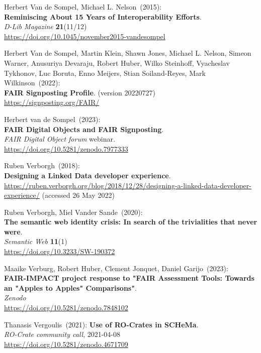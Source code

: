 \begin{thebibliography}{9}
Herbert Van de Sompel, Michael L. Nelson~(2015): \\
\textbf{Reminiscing About 15 Years of Interoperability Efforts}.\\
\emph{D-Lib Magazine} \textbf{21}(11/12) \\
\url{https://doi.org/10.1045/november2015-vandesompel}

Herbert Van de Sompel, Martin Klein, Shawn Jones, Michael L. Nelson, Simeon Warner, Anusuriya Devaraju, Robert Huber, Wilko Steinhoff, Vyacheslav Tykhonov, Luc Boruta, Enno Meijers, Stian Soiland-Reyes, Mark Wilkinson~(2022): \\
\textbf{FAIR Signposting Profile}. (version 20220727)\\
\url{https://signposting.org/FAIR/}

Herbert van de Sompel~(2023): \\
\textbf{FAIR Digital Objects and FAIR Signposting}.\\
\emph{FAIR Digital Object forum} webinar.\\
\url{https://doi.org/10.5281/zenodo.7977333}

Ruben Verborgh~(2018): \\
\textbf{Designing a {Linked Data} developer experience}.\\
\url{https://ruben.verborgh.org/blog/2018/12/28/designing-a-linked-data-developer-experience/}
(accessed 26 May 2022)

Ruben Verborgh, Miel Vander Sande~(2020): \\
\textbf{The semantic web identity crisis: In search of the trivialities that never were}.\\
\emph{Semantic Web} \textbf{11}(1)\\
\url{https://doi.org/10.3233/SW-190372}

Maaike Verburg, Robert Huber, Clement Jonquet, Daniel Garijo~(2023): \\
\textbf{{FAIR-IMPACT project response to "FAIR Assessment Tools: Towards an "Apples to Apples" Comparisons"}}.\\
\emph{Zenodo}\\
\url{https://doi.org/10.5281/zenodo.7848102}

Thanasis Vergoulis~(2021):   \textbf{Use of RO-Crates in SCHeMa}.\\
\emph{RO-Crate community call}, 2021-04-08\\
\url{https://doi.org/10.5281/zenodo.4671709}


\end{thebibliography}
